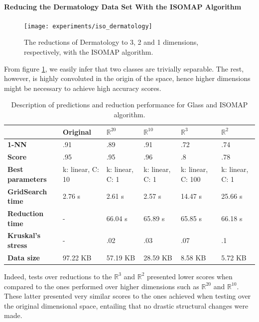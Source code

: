 \newpage
\paragraph{Reducing the Dermatology Data Set With the ISOMAP Algorithm}

\begin{figure}[H]
	\centering
	\captionsetup{justification=centering}
	\texttt{[image: experiments/iso\_dermatology]}
	\caption{The reductions of Dermatology to 3, 2 and 1 dimensions, respectively, with the ISOMAP algorithm.}
	\label{fig:dsdermatologyiso}
\end{figure}

From figure \ref{fig:dsdermatologyiso}, we easily infer that two classes are trivially separable. The rest, however, is highly convoluted in the origin of the space, hence higher dimensions might be necessary to achieve high accuracy scores.

\begin{table}[H]
	\centering
	
	\begin{tabular}{|p{.15\linewidth}|p{.12\linewidth}|p{.12\linewidth}|p{.12\linewidth}|p{.12\linewidth}|p{.12\linewidth}|}
		\hline
		& \textbf{Original} & $\mathbb{R}^{20}$ & $\mathbb{R}^{10}$ & $\mathbb{R}^3$ & $\mathbb{R}^2$ \\\hline
		\textbf{1-NN} & .91 & .89 & .91 & .72 & .74 \\\hline
		\textbf{Score} & .95 & .95 & .96 & .8 & .78 \\\hline
		\textbf{Best parameters} & k: linear, C: 10 & k: linear, C: 1 & k: linear, C: 1 & k: linear, C: 100 & k: linear, C: 1\\\hline
		\textbf{GridSearch time} & 2.76 s & 2.61 s & 2.57 s & 14.47 s & 25.66 s \\\hline
		\textbf{Reduction time} & - & 66.04 s & 65.89 s & 65.85 s & 66.18 s \\\hline
		\textbf{Kruskal's stress} & - & .02 & .03 & .07 & .1 \\\hline
		\textbf{Data size} & 97.22 KB & 57.19 KB & 28.59 KB & 8.58 KB & 5.72 KB \\\hline
	\end{tabular}
	\captionsetup{justification=centering}
	\caption{Description of predictions and reduction performance for Glass and ISOMAP algorithm.}
\end{table}

Indeed, tests over reductions to the $\mathbb{R}^3$ and $\mathbb{R}^2$ presented lower scores when compared to the ones performed over higher dimensions such as $\mathbb{R}^{20}$ and $\mathbb{R}^{10}$. These latter presented very similar scores to the ones achieved when testing over the original dimensional space, entailing that no drastic structural changes were made.


